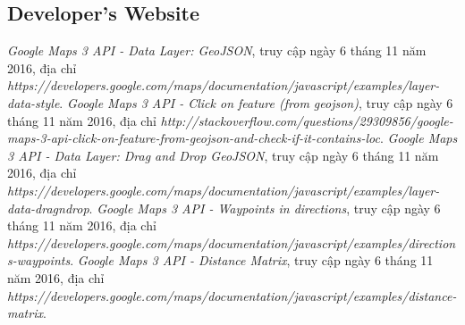 \documentclass[a4paper, 13pt]{report}
\begin{document}
\begin{thebibliography}{9}
\section*{Developer's Website}
	\emph{Google Maps 3 API - Data Layer: GeoJSON}, truy cập ngày 6 tháng 11 năm 2016,
	địa chỉ \emph{https://developers.google.com/maps/documentation/javascript/examples/layer-data-style}.	
	\emph{Google Maps 3 API - Click on feature (from geojson)}, truy cập ngày 6 tháng 11 năm 2016,
	địa chỉ \emph{http://stackoverflow.com/questions/29309856/google-maps-3-api-click-on-feature-from-geojson-and-check-if-it-contains-loc}.
	\emph{Google Maps 3 API - Data Layer: Drag and Drop GeoJSON}, truy cập ngày 6 tháng 11 năm 2016,
	địa chỉ \emph{https://developers.google.com/maps/documentation/javascript/examples/layer-data-dragndrop}.		
	\emph{Google Maps 3 API - Waypoints in directions}, truy cập ngày 6 tháng 11 năm 2016,
	địa chỉ \emph{https://developers.google.com/maps/documentation/javascript/examples/directions-waypoints}.	
	\emph{Google Maps 3 API - Distance Matrix}, truy cập ngày 6 tháng 11 năm 2016,
	địa chỉ \emph{https://developers.google.com/maps/documentation/javascript/examples/distance-matrix}.	
\end{thebibliography}
\pagebreak
\end{document}
